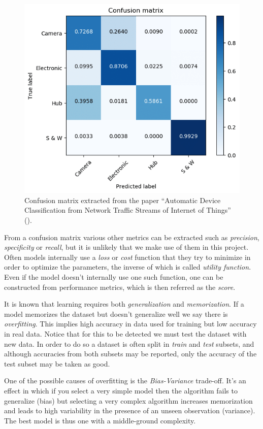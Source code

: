 \begin{figure}[H]
    \centering
    \includegraphics[width=0.5\linewidth]{img/ch4/confusion.png}
    \caption[Confusion matrix]{Confusion matrix extracted from the paper “Automatic Device Classification from Network Traffic Streams of Internet of Things” (\cite{bai_automatic_2018}).}
    \label{fig:ch4.confusion}
\end{figure}

From a confusion matrix various other metrics can be extracted such as \emph{precision}, \emph{specificity} or \emph{recall}, but it is unlikely that we make use of them in this project. Often models internally use a \emph{loss} or \emph{cost} function that they try to minimize in order to optimize the parameters, the inverse of which is called \emph{utility function}. Even if the model doesn't internally use one such function, one can be constructed from performance metrics, which is then referred as the \emph{score}. 

It is known that learning requires both \emph{generalization} and \emph{memorization}. If a model memorizes the dataset but doesn't generalize well we say there is \emph{overfitting}. This implies high accuracy in data used for training but low accuracy in real data. Notice that for this to be detected we must test the dataset with new data. In order to do so a dataset is often split in \emph{train} and \emph{test} subsets, and although accuracies from both subsets may be reported, only the accuracy of the test subset may be taken as good.

One of the possible causes of overfitting is the \emph{Bias-Variance} trade-off. It's an effect in which if you select a very simple model then the algorithm fails to generalize (bias) but selecting a very complex algorithm increases memorization and leads to high variability in the presence of an unseen observation (variance). The best model is thus one with a middle-ground complexity.

